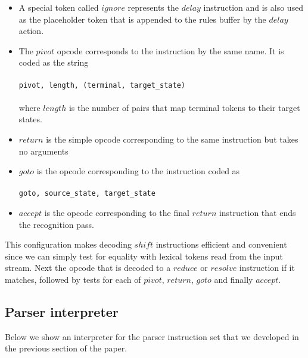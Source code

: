 \documentclass[11pt]{article}
\begin{document}
\begin{itemize}
\item A special token called $ignore$ represents the $delay$ instruction and is also used as the placeholder token that is appended to the rules buffer by the $delay$ action.
\item The $pivot$ opcode corresponds to the instruction by the same name. It is coded as the string\\\\
      \texttt{pivot, length, (terminal, target\_state)\*}\\\\
      where $length$ is the number of pairs that map terminal tokens to their target states.
\item $return$ is the simple opcode corresponding to the same instruction but takes no arguments
\item $goto$ is the opcode corresponding to the instruction coded as\\\\
      \texttt{goto, source\_state, target\_state}\\
\item $accept$ is the opcode corresponding to the final $return$ instruction that ends the recognition pass.
\end{itemize}

This configuration makes decoding $shift$ instructions efficient and convenient since we can simply test for equality with lexical tokens read from the input stream. 
Next the opcode that is decoded to a $reduce$ or $resolve$ instruction if it matches, followed by tests for each of $pivot$, $return$, $goto$ and finally $accept$.

\subsection{Parser interpreter}

Below we show an interpreter for the parser instruction set that we developed in the previous section of the paper. 
\end{document}
